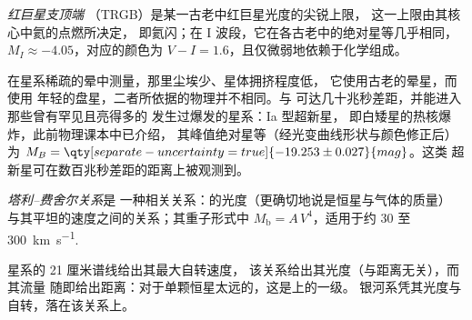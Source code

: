 \begin{definition}[红巨星支顶端]\label{def:b3:milky-way-galaxies:trgb}
\emph{红巨星支顶端}
（TRGB）是某一古老中红巨星光度的尖锐上限，
这一上限由其核心中氦的点燃所决定，
即氦闪；在 I 波段，它在各古老中的绝对星等几乎相同，
$M_I \approx -4.05$，对应的颜色为
$V - I = 1.6$，且仅微弱地依赖于化学组成。
\end{definition}

在星系稀疏的晕中测量，那里尘埃少、星体拥挤程度低，
它使用古老的晕星，而使用
年轻的盘星，二者所依据的物理并不相同。与
可达几十兆秒差距，并能进入那些曾有罕见且亮得多的
发生过爆发的星系：Ia 型超新星，
即白矮星的热核爆炸，此前物理课本中已介绍，
其峰值绝对星等（经光变曲线形状与颜色修正后）
为
$M_B = \qty[separate-uncertainty=true]{-19.253 \pm 0.027}{mag}$。这类
超新星可在数百兆秒差距的距离上被观测到。

\begin{definition}[塔利–费舍尔关系]\label{def:b3:milky-way-galaxies:tully-fisher}
\emph{塔利–费舍尔关系}是
一种相关关系：的光度（更确切地说是恒星与气体的质量）
与其平坦的速度之间的关系；其重子形式中
$M_\mathrm{b} = A\,V^4$，适用于约 30 至
\qty{300}{km.s^{-1}}.
\end{definition}

星系的 21 厘米谱线给出其最大自转速度，
该关系给出其光度（与距离无关），而其流量
随即给出距离：对于单颗恒星太远的，这是上的一级。
银河系凭其光度与自转，落在该关系上。

